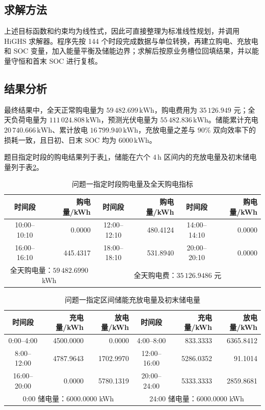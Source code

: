 \documentclass[withoutpreface]{cumcmthesis}
\begin{document}
\subsection{求解方法}
上述目标函数和约束均为线性式，因此可直接整理为标准线性规划，并调用 HiGHS 求解器\cite{huangfu2018}。程序先按 144 个时段完成数据与单位转换，再建立购电、充放电和 SOC 变量，加入能量平衡及储能边界；求解后按原业务槽位回填结果，并以能量守恒和首末 SOC 进行复核。

\subsection{结果分析}
最终结果中，全天正常购电量为 $59\,482.699\,\mathrm{kWh}$，购电费用为 $35\,126.949$ 元；全天负荷电量为 $111\,024.808\,\mathrm{kWh}$，预测光伏电量为 $55\,482.836\,\mathrm{kWh}$。储能累计充电 $20\,740.666\,\mathrm{kWh}$、累计放电 $16\,799.940\,\mathrm{kWh}$，充放电量之差与 $90\%$ 双向效率下的损耗一致，且日初、日末 SOC 均为 $6000\,\mathrm{kWh}$。

题目指定时段的购电结果列于表\ref{tab:q1_required_purchase}，储能在六个 $4\,\mathrm h$ 区间内的充放电量及初末储电量列于表\ref{tab:q1_required_storage}。

\begin{table}[!htbp]
\centering
\caption{问题一指定时段购电量及全天购电指标}
\label{tab:q1_required_purchase}
\small
\begin{tabular}{crcrcr}
\toprule
时间段 & 购电量/kWh & 时间段 & 购电量/kWh & 时间段 & 购电量/kWh\\
\midrule
10:00--10:10 & 0.0000 & 12:00--12:10 & 480.4124 & 14:00--14:10 & 0.0000\\
16:00--16:10 & 445.4317 & 18:00--18:10 & 531.8940 & 20:00--20:10 & 0.0000\\
\midrule
\multicolumn{2}{c}{全天购电量：$59\,482.6990$ kWh} & \multicolumn{4}{c}{全天购电费：$35\,126.9486$ 元}\\
\bottomrule
\end{tabular}
\end{table}

\begin{table}[!htbp]
\centering
\caption{问题一指定区间储能充放电量及初末储电量}
\label{tab:q1_required_storage}
\small
\begin{tabular}{crrcrr}
\toprule
时间段 & 充电量/kWh & 放电量/kWh & 时间段 & 充电量/kWh & 放电量/kWh\\
\midrule
0:00--4:00 & 4500.0000 & 0.0000 & 4:00--8:00 & 833.3333 & 6365.8412\\
8:00--12:00 & 4787.9643 & 1702.9970 & 12:00--16:00 & 5286.0352 & 91.1014\\
16:00--20:00 & 0.0000 & 5780.1319 & 20:00--24:00 & 5333.3333 & 2859.8681\\
\midrule
\multicolumn{3}{c}{0:00 储电量：$6000.0000$ kWh} & \multicolumn{3}{c}{24:00 储电量：$6000.0000$ kWh}\\
\bottomrule
\end{tabular}
\end{table}
\end{document}
